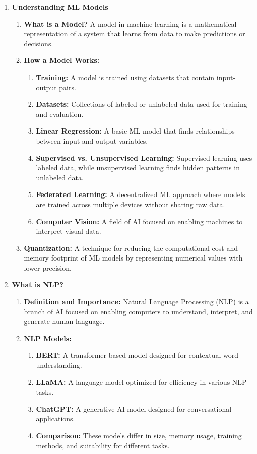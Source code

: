 \documentclass[licencjacka,en]{pracamgr}
\begin{document}
\begin{enumerate}
    \item \textbf{Understanding ML Models}
    \begin{enumerate}
        \item \textbf{What is a Model?} A model in machine learning is a mathematical representation of a system that learns from data to make predictions or decisions.
        \item \textbf{How a Model Works:}
        \begin{enumerate}
            \item \textbf{Training:} A model is trained using datasets that contain input-output pairs.
            \item \textbf{Datasets:} Collections of labeled or unlabeled data used for training and evaluation.
            \item \textbf{Linear Regression:} A basic ML model that finds relationships between input and output variables.
            \item \textbf{Supervised vs. Unsupervised Learning:} Supervised learning uses labeled data, while unsupervised learning finds hidden patterns in unlabeled data.
            \item \textbf{Federated Learning:} A decentralized ML approach where models are trained across multiple devices without sharing raw data.
            \item \textbf{Computer Vision:} A field of AI focused on enabling machines to interpret visual data.
        \end{enumerate}
        \item \textbf{Quantization:} A technique for reducing the computational cost and memory footprint of ML models by representing numerical values with lower precision.
    \end{enumerate}

    \item \textbf{What is NLP?}
    \begin{enumerate}
        \item \textbf{Definition and Importance:} Natural Language Processing (NLP) is a branch of AI focused on enabling computers to understand, interpret, and generate human language.
        \item \textbf{NLP Models:}
        \begin{enumerate}
            \item \textbf{BERT:} A transformer-based model designed for contextual word understanding.
            \item \textbf{LLaMA:} A language model optimized for efficiency in various NLP tasks.
            \item \textbf{ChatGPT:} A generative AI model designed for conversational applications.
            \item \textbf{Comparison:} These models differ in size, memory usage, training methods, and suitability for different tasks.
        \end{enumerate}
    \end{enumerate}


\end{enumerate}
\end{document}
